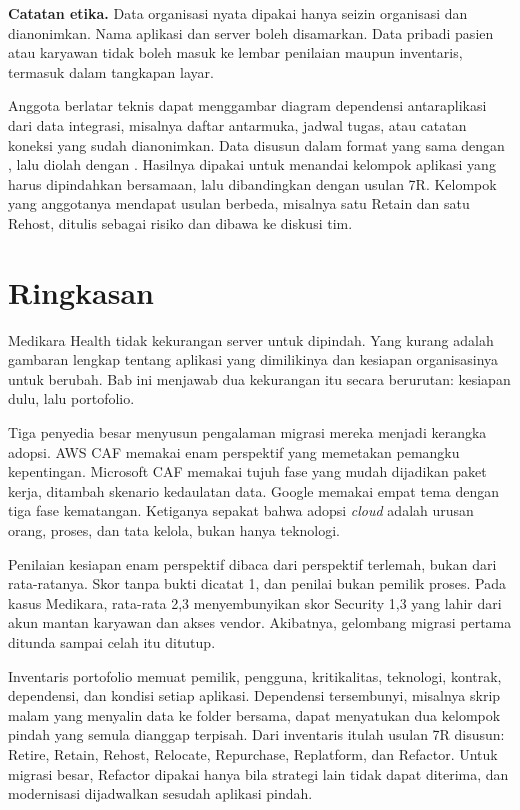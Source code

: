 \textbf{Catatan etika.} Data organisasi nyata dipakai hanya seizin organisasi dan
dianonimkan. Nama aplikasi dan server boleh disamarkan. Data pribadi pasien atau karyawan
tidak boleh masuk ke lembar penilaian maupun inventaris, termasuk dalam tangkapan layar.

\begin{pendalaman}[title={Pendalaman Teknis (opsional): Diagram Dependensi dari Data Integrasi}]
  Anggota berlatar teknis dapat menggambar diagram dependensi antaraplikasi dari data
  integrasi, misalnya daftar antarmuka, jadwal tugas, atau catatan koneksi yang sudah
  dianonimkan. Data disusun dalam format yang sama dengan
  , lalu diolah dengan
  . Hasilnya dipakai untuk menandai kelompok
  aplikasi yang harus dipindahkan bersamaan, lalu dibandingkan dengan usulan 7R. Kelompok
  yang anggotanya mendapat usulan berbeda, misalnya satu Retain dan satu Rehost, ditulis
  sebagai risiko dan dibawa ke diskusi tim.
\end{pendalaman}

\section{Ringkasan}

Medikara Health tidak kekurangan server untuk dipindah. Yang kurang adalah gambaran
lengkap tentang aplikasi yang dimilikinya dan kesiapan organisasinya untuk berubah. Bab
ini menjawab dua kekurangan itu secara berurutan: kesiapan dulu, lalu portofolio.

Tiga penyedia besar menyusun pengalaman migrasi mereka menjadi kerangka adopsi. AWS CAF
memakai enam perspektif yang memetakan pemangku kepentingan. Microsoft CAF memakai tujuh
fase yang mudah dijadikan paket kerja, ditambah skenario kedaulatan data. Google memakai
empat tema dengan tiga fase kematangan. Ketiganya sepakat bahwa adopsi \textit{cloud}
adalah urusan orang, proses, dan tata kelola, bukan hanya teknologi.

Penilaian kesiapan enam perspektif dibaca dari perspektif terlemah, bukan dari
rata-ratanya. Skor tanpa bukti dicatat 1, dan penilai bukan pemilik proses. Pada kasus
Medikara, rata-rata 2,3 menyembunyikan skor Security 1,3 yang lahir dari akun mantan
karyawan dan akses vendor. Akibatnya, gelombang migrasi pertama ditunda sampai celah itu
ditutup.

Inventaris portofolio memuat pemilik, pengguna, kritikalitas, teknologi, kontrak,
dependensi, dan kondisi setiap aplikasi. Dependensi tersembunyi, misalnya skrip malam
yang menyalin data ke folder bersama, dapat menyatukan dua kelompok pindah yang semula
dianggap terpisah. Dari inventaris itulah usulan 7R disusun: Retire, Retain, Rehost,
Relocate, Repurchase, Replatform, dan Refactor. Untuk migrasi besar, Refactor dipakai
hanya bila strategi lain tidak dapat diterima, dan modernisasi dijadwalkan sesudah
aplikasi pindah.


